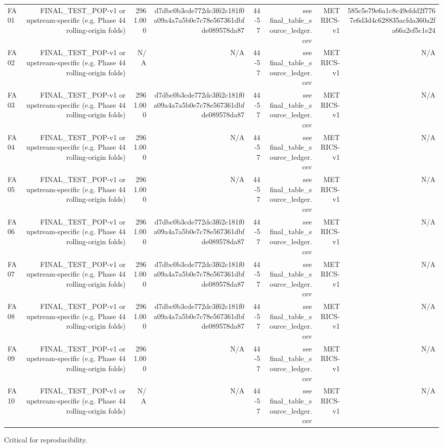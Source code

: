 \begin{table}[h!]
\begin{tabular}{lrrrrrrr}
FA01 & FINAL\_TEST\_POP-v1 or upstream-specific (e.g. Phase 44 rolling-origin folds) & 2961.000 & d7dbc0b3cde772dc3f62c181f0a09a4a7a5b0e7c78e567361dbfde089578da87 & 44-57 & see final\_table\_source\_ledger.csv & METRICS-v1 & 585c5e79e6a1c8c49efdd2f7767e6d3d4c628835acfda360a2fa66a2ef5c1e24 \\
FA02 & FINAL\_TEST\_POP-v1 or upstream-specific (e.g. Phase 44 rolling-origin folds) & N/A & N/A & 44-57 & see final\_table\_source\_ledger.csv & METRICS-v1 & N/A \\
FA03 & FINAL\_TEST\_POP-v1 or upstream-specific (e.g. Phase 44 rolling-origin folds) & 2961.000 & d7dbc0b3cde772dc3f62c181f0a09a4a7a5b0e7c78e567361dbfde089578da87 & 44-57 & see final\_table\_source\_ledger.csv & METRICS-v1 & N/A \\
FA04 & FINAL\_TEST\_POP-v1 or upstream-specific (e.g. Phase 44 rolling-origin folds) & 2961.000 & N/A & 44-57 & see final\_table\_source\_ledger.csv & METRICS-v1 & N/A \\
FA05 & FINAL\_TEST\_POP-v1 or upstream-specific (e.g. Phase 44 rolling-origin folds) & 2961.000 & N/A & 44-57 & see final\_table\_source\_ledger.csv & METRICS-v1 & N/A \\
FA06 & FINAL\_TEST\_POP-v1 or upstream-specific (e.g. Phase 44 rolling-origin folds) & 2961.000 & d7dbc0b3cde772dc3f62c181f0a09a4a7a5b0e7c78e567361dbfde089578da87 & 44-57 & see final\_table\_source\_ledger.csv & METRICS-v1 & N/A \\
FA07 & FINAL\_TEST\_POP-v1 or upstream-specific (e.g. Phase 44 rolling-origin folds) & 2961.000 & d7dbc0b3cde772dc3f62c181f0a09a4a7a5b0e7c78e567361dbfde089578da87 & 44-57 & see final\_table\_source\_ledger.csv & METRICS-v1 & N/A \\
FA08 & FINAL\_TEST\_POP-v1 or upstream-specific (e.g. Phase 44 rolling-origin folds) & 2961.000 & d7dbc0b3cde772dc3f62c181f0a09a4a7a5b0e7c78e567361dbfde089578da87 & 44-57 & see final\_table\_source\_ledger.csv & METRICS-v1 & N/A \\
FA09 & FINAL\_TEST\_POP-v1 or upstream-specific (e.g. Phase 44 rolling-origin folds) & 2961.000 & N/A & 44-57 & see final\_table\_source\_ledger.csv & METRICS-v1 & N/A \\
FA10 & FINAL\_TEST\_POP-v1 or upstream-specific (e.g. Phase 44 rolling-origin folds) & N/A & N/A & 44-57 & see final\_table\_source\_ledger.csv & METRICS-v1 & N/A \\
\bottomrule
\end{tabular}
\vspace{4pt}
\footnotesize{Critical for reproducibility.}\\
\end{table}
